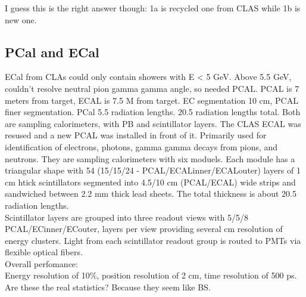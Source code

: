 I guess this is the right answer though:
1a is recycled one from CLAS while 1b is new one.
            
            
        \subsection{PCal and ECal}
            ECal from CLAs could only contain showers with E < 5 GeV. Above 5.5 GeV, couldn't resolve neutral pion gamma gamma angle, so needed PCAL. PCAL is 7 meters from target, ECAL is 7.5 M from target. EC segmentation 10 cm, PCAL finer segmentation. PCal 5.5 radiation lengths. 20.5 radiation lengths total. Both are sampling calorimeters, with PB and scintillator layers. The CLAS ECAL was resused and a new PCAL was installed in front of it. Primarily used for identification of electrons, photons, gamma gamma decays from pions, and neutrons. They are sampling calorimeters with six moduels. Each module has a triangular shape with 54 (15/15/24 - PCAL/ECALinner/ECALouter) layers of 1 cm htick scintillators segmented into 4.5/10 cm (PCAL/ECAL) wide strips and sandwiched between 2.2 mm thick lead sheets. The total thickness is about 20.5 radiation lengths. \\
            \indent Scintillator layers are grouped into three readout views with 5/5/8 PCAL/ECinner/ECouter, layers per view providing several cm resolution of energy clusters. Light from each scintillator readout group is routed to PMTs via flexible optical fibers.\\
            Overall perfomance:\\
            Energy resolution of 10\%, position resolution of 2 cm, time resolution of 500 ps. \\
            Are these the real statistics? Because they seem like BS.
            
            
            
